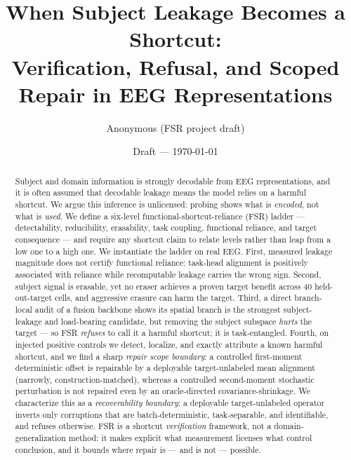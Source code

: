 \documentclass[10pt,conference]{article}
\title{When Subject Leakage Becomes a Shortcut:\\ Verification, Refusal, and Scoped Repair in EEG Representations}
\author{Anonymous (FSR project draft)}
\date{Draft --- \today}
\begin{document}
\maketitle

\begin{abstract}
Subject and domain information is strongly decodable from EEG representations, and it is often assumed
that decodable leakage means the model relies on a harmful shortcut. We argue this inference is
unlicensed: probing shows what is \emph{encoded}, not what is \emph{used}. We define a six-level
functional-shortcut-reliance (FSR) ladder --- detectability, reducibility, erasability, task coupling,
functional reliance, and target consequence --- and require any shortcut claim to relate levels rather
than leap from a low one to a high one. We instantiate the ladder on real EEG. First, measured leakage
magnitude does not certify functional reliance: task-head alignment is positively associated with
reliance while recomputable leakage carries the wrong sign. Second, subject signal is erasable, yet no
eraser achieves a proven target benefit across 40 held-out-target cells, and aggressive erasure can harm
the target. Third, a direct branch-local audit of a fusion backbone shows its spatial branch is the
strongest subject-leakage and load-bearing candidate, but removing the subject subspace \emph{hurts} the
target --- so FSR \emph{refuses} to call it a harmful shortcut; it is task-entangled. Fourth, on injected
positive controls we detect, localize, and exactly attribute a known harmful shortcut, and we find a
sharp \emph{repair scope boundary}: a controlled first-moment deterministic offset is repairable by a
deployable target-unlabeled mean alignment (narrowly, construction-matched), whereas a controlled
second-moment stochastic perturbation is not repaired even by an oracle-directed covariance-shrinkage.
We characterize this as a \emph{recoverability boundary}: a deployable target-unlabeled operator inverts
only corruptions that are batch-deterministic, task-separable, and identifiable, and refuses otherwise.
FSR is a shortcut \emph{verification} framework, not a domain-generalization method: it makes explicit
what measurement licenses what control conclusion, and it bounds where repair is --- and is not ---
possible.
\end{abstract}













\appendix





\end{document}
